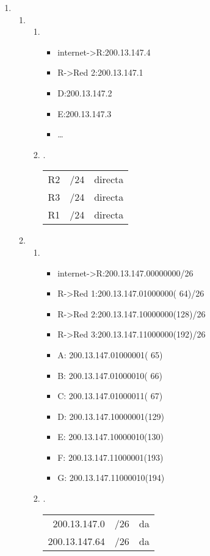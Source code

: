 \documentclass[11pt]{article}
\begin{document}
\begin{enumerate}
\begin{enumerate}
\end{enumerate}
\item \begin{enumerate}
\item \begin{enumerate}
\item \begin{itemize}
\item internet->R:200.13.147.4
\item R->Red 2:200.13.147.1
\item D:200.13.147.2
\item E:200.13.147.3
\item \ldots{}
\end{itemize}
\item .
\begin{center}
\begin{tabular}{lll}
R2 & /24 & directa\\
R3 & /24 & directa\\
R1 & /24 & directa\\
\end{tabular}
\end{center}
\end{enumerate}
\item \begin{enumerate}
\item \begin{itemize}
\item internet->R:200.13.147.00000000/26
\item R->Red 1:200.13.147.01000000( 64)/26
\item R->Red 2:200.13.147.10000000(128)/26
\item R->Red 3:200.13.147.11000000(192)/26
\item A: 200.13.147.01000001( 65)
\item B: 200.13.147.01000010( 66)
\item C: 200.13.147.01000011( 67)
\item D: 200.13.147.10000001(129)
\item E: 200.13.147.10000010(130)
\item F: 200.13.147.11000001(193)
\item G: 200.13.147.11000010(194)
\end{itemize}
\item .
\begin{center}
\begin{tabular}{rll}
200.13.147.0 & /26 & da\\
200.13.147.64 & /26 & da\\

\end{tabular}
\end{center}
\end{enumerate}
\end{enumerate}
\end{enumerate}
\end{document}
